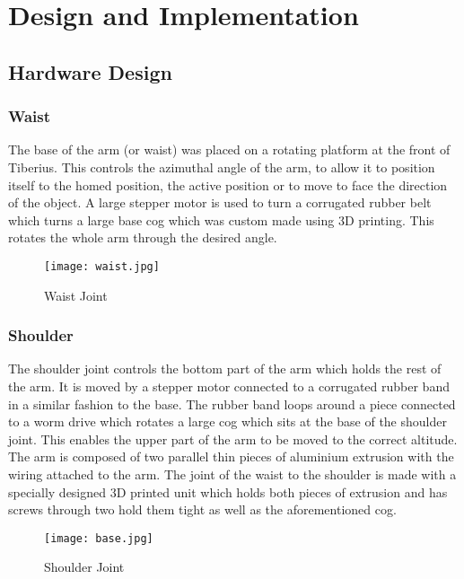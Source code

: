\section{Design and Implementation}

\subsection{Hardware Design}


\subsubsection{Waist}
The base of the arm (or waist) was placed on a rotating platform at the front of Tiberius.  This controls the azimuthal angle of the arm, to allow it to position itself to the homed position, the active position or to move to face the direction of the object.  A large stepper motor is used to turn a corrugated rubber belt which turns a large base cog which was custom made using 3D printing.  This rotates the whole arm through the desired angle.

\begin{figure}[!htb]
\begin{center}
\texttt{[image: waist.jpg]}
\end{center}
\caption{Waist Joint}
\label{fig:waist}
\end{figure}

\subsubsection{Shoulder}
The shoulder joint controls the bottom part of the arm which holds the rest of the arm.  It is moved by a stepper motor connected to a corrugated rubber band in a similar fashion to the base.  The rubber band loops around a piece connected to a worm drive which rotates a large cog which sits at the base of the shoulder joint.  This enables the upper part of the arm to be moved to the correct altitude.  The arm is composed of two parallel thin pieces of aluminium extrusion with the wiring attached to the arm.  The joint of the waist to the shoulder is made with a specially designed 3D printed unit which holds both pieces of extrusion and has screws through two hold them tight as well as the aforementioned cog.  

\begin{figure}[!htb]
\begin{center}
\texttt{[image: base.jpg]}
\end{center}
\caption{Shoulder Joint}
\label{fig:shoulder}
\end{figure}

